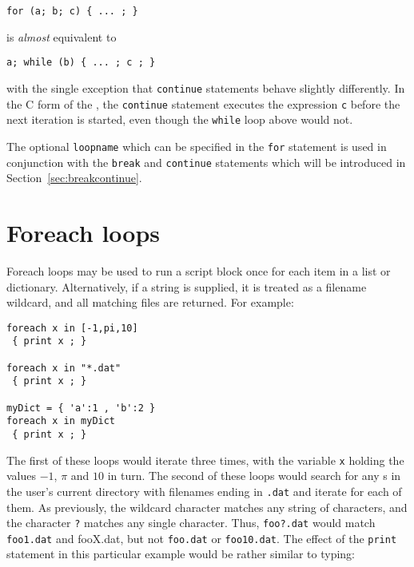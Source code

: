 \begin{verbatim}
for (a; b; c) { ... ; }
\end{verbatim}

\noindent is {\it almost} equivalent to

\begin{verbatim}
a; while (b) { ... ; c ; }
\end{verbatim}

\noindent with the single exception that {\tt continue} statements behave
slightly differently.  In the C form of the , the {\tt continue}
statement executes the expression {\tt c} before the next iteration is started,
even though the {\tt while} loop above would not.

The optional {\tt loopname} which can be specified in the {\tt for} statement
is used in conjunction with the {\tt break} and {\tt continue} statements which
will be introduced in Section~\ref{sec:breakcontinue}.

\section{Foreach loops}
\label{sec:foreach}

Foreach loops may be used to run a script block once for each item in a list or
dictionary. Alternatively, if a string is supplied, it is treated as a filename
wildcard, and all matching files are returned. For example:

\begin{verbatim}
foreach x in [-1,pi,10]
 { print x ; }

foreach x in "*.dat"
 { print x ; }

myDict = { 'a':1 , 'b':2 }
foreach x in myDict
 { print x ; }

\end{verbatim}

The first of these loops would iterate three times, with the variable {\tt x}
holding the values $-1$, $\pi$ and $10$ in turn. The second of these loops
would search for any \datafile s in the user's current directory with filenames
ending in {\tt .dat} and iterate for each of them. As previously, the wildcard
character {\tt *} matches any string of characters, and the character {\tt ?}
matches any single character. Thus, {\tt foo?.dat} would match {\tt foo1.dat}
and {fooX.dat}, but not {\tt foo.dat} or {\tt foo10.dat}. The effect of the
{\tt print} statement in this particular example would be rather similar to
typing:

